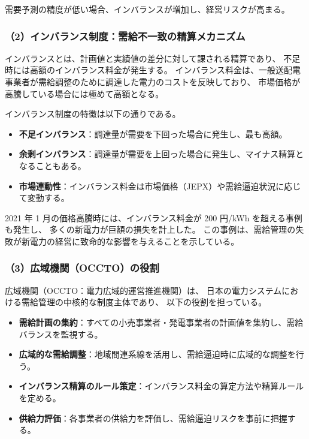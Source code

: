 需要予測の精度が低い場合、インバランスが増加し、経営リスクが高まる。

\subsubsection{（2）インバランス制度：需給不一致の精算メカニズム}

インバランスとは、計画値と実績値の差分に対して課される精算であり、
不足時には高額のインバランス料金が発生する。
インバランス料金は、一般送配電事業者が需給調整のために調達した電力のコストを反映しており、
市場価格が高騰している場合には極めて高額となる。

インバランス制度の特徴は以下の通りである。

\begin{itemize}
  \item \textbf{不足インバランス}：調達量が需要を下回った場合に発生し、最も高額。
  \item \textbf{余剰インバランス}：調達量が需要を上回った場合に発生し、マイナス精算となることもある。
  \item \textbf{市場連動性}：インバランス料金は市場価格（JEPX）や需給逼迫状況に応じて変動する。
\end{itemize}

2021 年 1 月の価格高騰時には、インバランス料金が 200 円/kWh を超える事例も発生し、
多くの新電力が巨額の損失を計上した。
この事例は、需給管理の失敗が新電力の経営に致命的な影響を与えることを示している。

\subsubsection{（3）広域機関（OCCTO）の役割}

広域機関（OCCTO：電力広域的運営推進機関）は、
日本の電力システムにおける需給管理の中核的な制度主体であり、
以下の役割を担っている。

\begin{itemize}
  \item \textbf{需給計画の集約}：すべての小売事業者・発電事業者の計画値を集約し、需給バランスを監視する。
  \item \textbf{広域的な需給調整}：地域間連系線を活用し、需給逼迫時に広域的な調整を行う。
  \item \textbf{インバランス精算のルール策定}：インバランス料金の算定方法や精算ルールを定める。
  \item \textbf{供給力評価}：各事業者の供給力を評価し、需給逼迫リスクを事前に把握する。
\end{itemize}

